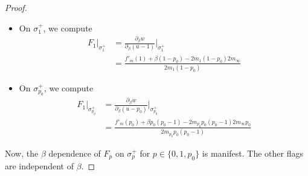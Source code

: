 \documentclass[12pt,letterpaper,reqno]{amsart}
\def\mathbf#1{#1}%
\theoremstyle{remark}
\theoremstyle{definition}
\numberwithin{thm}{section}
\numberwithin{equation}{section}
\numberwithin{figure}{section}
\begin{document}
\begin{proof}
\begin{itemize}
Evaluated on $\sigma^+_0$ ($u=0$, $w=m_0 p_0$), this gives 
\[ 0 = \left( f'_{\mathbf{m}}(0)  + \beta p_0 \right)\partial_\beta u    - 2 (m_0p_0)\partial_\beta w. \]
   \item On $\sigma^+_1$,
   we compute 
   \begin{align*}
F_1\Big|_{\sigma^+_1} &= 
\frac{\partial_\beta w}{\partial_\beta (u-1)} \Big|_{\sigma^+_1}\\  
&=  \frac{f'_{\mathbf{m}}(1) + \beta(1-p_0)- 2 m_1(1-p_0) 2 m_\infty}{2m_1(1-p_0)} 
 \end{align*}
   \item On $\sigma^+_{p_0}$, we compute
      \begin{align*}
F_1\Big|_{\sigma^+_{p_0}} &= 
\frac{\partial_\beta w}{\partial_\beta (u-p_0)} \Big|_{\sigma^+_{p_0}}\\  
&=  \frac{f'_{\mathbf{m}}(p_0) + \beta p_0(p_0-1)- 2 m_{p_0} p_0(p_0-1)2 m_\infty p_0}{2 m_{p_0} p_0(p_0-1)} 
 \end{align*}
   \end{itemize}
   Now, the $\beta$ dependence of $F_{p}$ on $\sigma^+_p$ for $p \in \{0, 1, p_0\}$ is manifest. The other flags are independent of $\beta$.
   

\end{proof}
\end{document}
